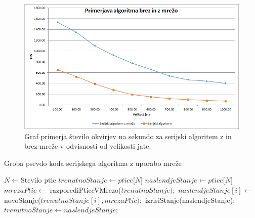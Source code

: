 \documentclass[a4paper, 12pt]{book}
\begin{document}
\begin{table}[]
\centering
{}
\caption{Primerjava števila okvirjev na sekundo (ang. Frames per second) v odvisnosti od velikosti jate za serijski algoritem in serijski algoritem z mrežo}
\label{tabela_meritev_serijskih_alg}
\end{table}

\begin{figure}[t]
\includegraphics[width=\textwidth]{graf_serial_alg}
\caption{Graf primerja število okvirjev na sekundo za serijski algoritem z in brez mreže v odvisnosti od velikosti jate.}
\label{img:graf_serial_alg}
\centering
\end{figure}

\begin{algorithm}
\caption{Groba psevdo koda serijskega algoritma z uporabo mreže}\label{serial_grid_pseudo_code}
\begin{algorithmic}[1]
\State $N \gets \text{Stevilo ptic}$
\State $trenutnoStanje \gets \textit{ptice[N]}$
\State $naslendjeStanje \gets \textit{ptice[N]}$
\Loop
\State $mrezaPtic \gets$ razporediPticeVMrezo($trenutnoStanje);$
\State $naslendjeStanje[i] \gets$ novoStanje($trenutnoStanje[i], mrezaPtic);$
\EndFor
\State izrisiStanje(naslendjeStanje);
\State $trenutnoStanje \gets naslendjeStanje;$
\EndLoop
\end{algorithmic}
\end{algorithm}
\end{document}
